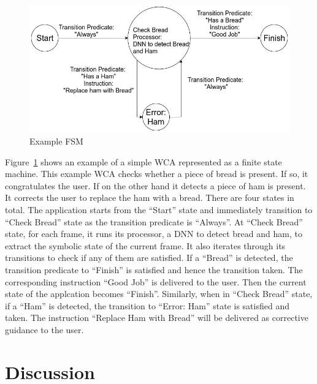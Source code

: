 \begin{figure}
  \centering
  \includegraphics[trim={0 0 0 0},width=\linewidth]{FIGS/fsm-example}
	\caption{Example FSM}
    \label{figs:fsm-example}
\end{figure}

Figure~\ref{figs:fsm-example} shows an example of a simple WCA represented as a
finite state machine. This example WCA checks whether a piece of bread is
present. If so, it congratulates the user. If on the other hand it detects a
piece of ham is present. It corrects the user to replace the ham with a bread.
There are four states in total. The application starts from the ``Start'' state
and immediately transition to ``Check Bread'' state as the transition predicate
is ``Always''. At ``Check Bread'' state, for each frame, it runs its processor,
a DNN to detect bread and ham, to extract the symbolic state of the current
frame. It also iterates through its transitions to check if any of them are
satisfied. If a ``Bread'' is detected, the transition predicate to ``Finish'' is
satisfied and hence the transition taken. The corresponding instruction ``Good
Job'' is delivered to the user. Then the current state of the applcation becomes
``Finish''. Similarly, when in ``Check Bread'' state, if a ``Ham'' is detected,
the transition to ``Error: Ham'' state is satisfied and taken. The instruction
``Replace Ham with Bread'' will be delivered as corrective guidance to the user.



\section{Discussion}
